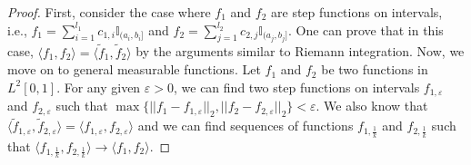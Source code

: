 \documentclass[reqno,12pt]{amsart}
\theoremstyle{plain}
\theoremstyle{definition}
\let\tilde\widetilde
\begin{document}
\begin{proof}
    First, consider the case where $f_{1}$ and $f_{2}$ are step functions on intervals, i.e., $f_{1}= \sum_{i=1}^{l_{1}} c_{1,i} \mathbb{I}_{(a_{i},b_{i}]}$ and $f_{2}= \sum_{j=1}^{l_{2}} c_{2,j} \mathbb{I}_{(a_{j},b_{j}]}$. One can prove that in this case, $\langle f_{1},f_{2} \rangle = \langle \tilde{f}_{1}, \tilde{f}_{2} \rangle $ by the arguments similar to Riemann integration. Now, we move on to general measurable functions. Let $f_{1}$ and $f_{2}$ be two functions in $L^{2}[0,1]$. For any given $\varepsilon >0$, we can find two step functions on intervals $f_{1,\varepsilon}$ and $f_{2,\varepsilon}$ such that 
    $\max\{||f_{1}-f_{1,\varepsilon}||_{2}, ||f_{2}-f_{2,\varepsilon}||_{2} \} < \varepsilon$.
    We also know that $\langle \tilde{f}_{1,\varepsilon}, \tilde{f}_{2,\varepsilon} \rangle = \langle f_{1,\varepsilon}, f_{2,\varepsilon}\rangle$ and we can find sequences of functions $f_{1, \frac{1}{k}}$ and $f_{2,\frac{1}{k}}$ such that 
    $\langle f_{1,\frac{1}{k}}, f_{2, \frac{1}{k}} \rangle \to \langle f_{1}, f_{2} \rangle $.


\end{proof}
\end{document}
